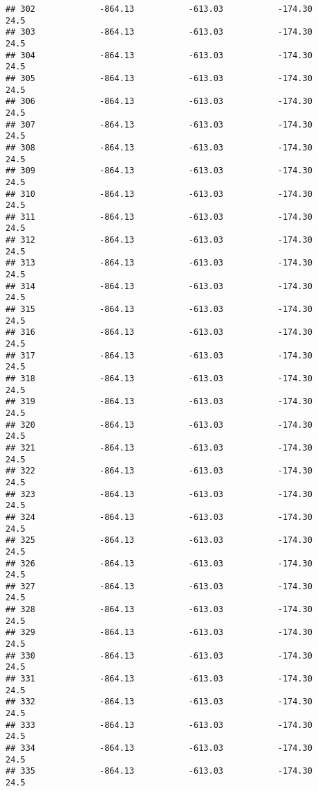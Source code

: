 \documentclass[]{article}
\begin{document}
\begin{verbatim}
## 302             -864.13           -613.03           -174.30           24.5
## 303             -864.13           -613.03           -174.30           24.5
## 304             -864.13           -613.03           -174.30           24.5
## 305             -864.13           -613.03           -174.30           24.5
## 306             -864.13           -613.03           -174.30           24.5
## 307             -864.13           -613.03           -174.30           24.5
## 308             -864.13           -613.03           -174.30           24.5
## 309             -864.13           -613.03           -174.30           24.5
## 310             -864.13           -613.03           -174.30           24.5
## 311             -864.13           -613.03           -174.30           24.5
## 312             -864.13           -613.03           -174.30           24.5
## 313             -864.13           -613.03           -174.30           24.5
## 314             -864.13           -613.03           -174.30           24.5
## 315             -864.13           -613.03           -174.30           24.5
## 316             -864.13           -613.03           -174.30           24.5
## 317             -864.13           -613.03           -174.30           24.5
## 318             -864.13           -613.03           -174.30           24.5
## 319             -864.13           -613.03           -174.30           24.5
## 320             -864.13           -613.03           -174.30           24.5
## 321             -864.13           -613.03           -174.30           24.5
## 322             -864.13           -613.03           -174.30           24.5
## 323             -864.13           -613.03           -174.30           24.5
## 324             -864.13           -613.03           -174.30           24.5
## 325             -864.13           -613.03           -174.30           24.5
## 326             -864.13           -613.03           -174.30           24.5
## 327             -864.13           -613.03           -174.30           24.5
## 328             -864.13           -613.03           -174.30           24.5
## 329             -864.13           -613.03           -174.30           24.5
## 330             -864.13           -613.03           -174.30           24.5
## 331             -864.13           -613.03           -174.30           24.5
## 332             -864.13           -613.03           -174.30           24.5
## 333             -864.13           -613.03           -174.30           24.5
## 334             -864.13           -613.03           -174.30           24.5
## 335             -864.13           -613.03           -174.30           24.5

\end{verbatim}
\end{document}
